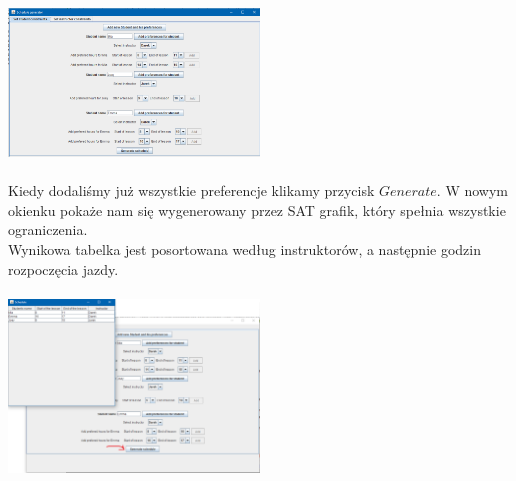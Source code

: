 \documentclass{article}
\begin{document}
\includegraphics[width=0.5\textwidth]{screen-kursanci.png} \\ \\
Kiedy dodaliśmy już wszystkie preferencje klikamy przycisk $Generate$. W nowym okienku pokaże nam się wygenerowany przez SAT grafik, który spełnia wszystkie ograniczenia. \\ Wynikowa tabelka jest posortowana według instruktorów, a następnie godzin rozpoczęcia jazdy. \\ \\
\includegraphics[width=0.5\textwidth]{screen-final.png}
\end{document}
